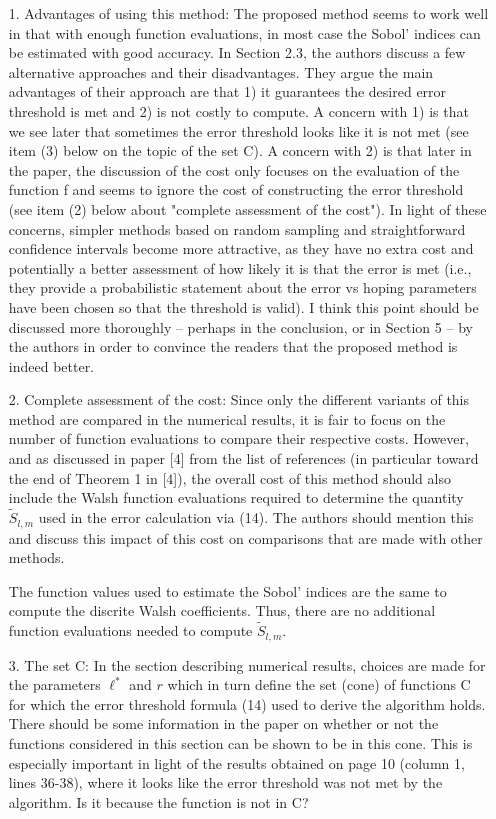 \documentclass[10pt,a4paper]{article}
\newcommand{\answer}[1]{{\color{blue} #1 }}
\begin{document}
\begin{itemize}
\item[1.] Advantages of using this method: The proposed method seems to work well in that with enough function evaluations, in most case the Sobol' indices can be estimated with good accuracy. In Section 2.3, the authors discuss a few alternative approaches and their disadvantages. They argue the main advantages of their approach are that 1) it guarantees the desired error threshold is met and 2) is not costly to compute. A concern with 1) is that we see later that sometimes the error threshold looks like it is not met (see item (3) below on the topic of the set C). A concern with 2) is that later in the paper, the discussion of the cost only focuses on the evaluation of the function f and seems to ignore the cost of constructing the error threshold (see item (2) below about "complete assessment of the cost"). In light of these concerns, simpler methods based on random sampling and straightforward confidence intervals become more attractive, as they have no extra cost and potentially a better assessment of how likely it is that the error is met (i.e., they provide a probabilistic statement about the error vs hoping parameters have been chosen so that the threshold is valid). I think this point should be discussed more thoroughly -- perhaps in the conclusion, or in Section 5 -- by the authors in order to convince the readers that the proposed method is indeed better.

\item[2.] Complete assessment of the cost: Since only the different variants of this method are compared in the numerical results, it is fair to focus on the number of function evaluations to compare their respective costs. However, and as discussed in paper [4] from the list of references (in particular toward the end of Theorem 1 in [4]), the overall cost of this method should also include the Walsh function evaluations required to determine the quantity $\widetilde{S}_{l,m}$ used in the error calculation via (14). The authors should mention this and discuss this impact of this cost on comparisons that are made with other methods.

\answer{The function values used to estimate the Sobol' indices are the same to compute the discrite Walsh coefficients. Thus, there are no additional function evaluations needed to compute $\widetilde{S}_{l,m}$. }

\item[3.]The set C: In the section describing numerical results, choices are made for the parameters $\ell^*$ and $r$ which in turn define the set (cone) of functions C for which the error threshold formula (14) used to derive the algorithm holds. There should be some information in the paper on whether or not the functions considered in this section can be shown to be in this cone. This is especially important in light of the results obtained on page 10 (column 1, lines 36-38), where it looks like the error threshold was not met by the algorithm. Is it because the function is not in C?


\end{itemize}
\end{document}
